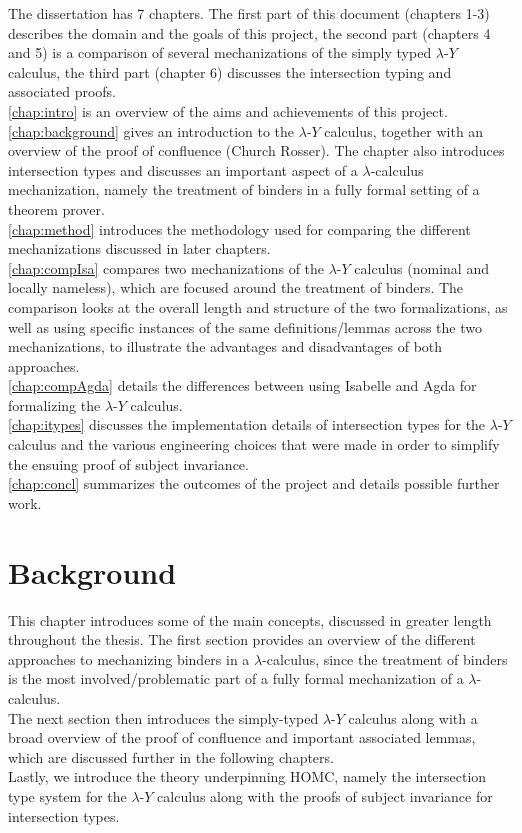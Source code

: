 \documentclass[a4paper, 12pt, twoside]{style/ociamthesis}
\theoremstyle{plain}
\theoremstyle{definition}
\theoremstyle{remark}
\newcommand{\lamy}{\lambda\text{-}Y}
\begin{document}
The dissertation has 7 chapters. The first part of this document
(chapters 1-3) describes the domain and the goals of this project, the
second part (chapters 4 and 5) is a comparison of several mechanizations
of the simply typed \(\lamy\) calculus, the third part (chapter 6)
discusses the intersection typing and associated proofs.\\
\cref{chap:intro} is an overview of the aims and achievements of this
project.\\
\cref{chap:background} gives an introduction to the \(\lamy\) calculus,
together with an overview of the proof of confluence (Church Rosser).
The chapter also introduces intersection types and discusses an
important aspect of a \(\lambda\)-calculus mechanization, namely the
treatment of binders in a fully formal setting of a theorem prover.\\
\cref{chap:method} introduces the methodology used for comparing the
different mechanizations discussed in later chapters.\\
\cref{chap:compIsa} compares two mechanizations of the \(\lamy\)
calculus (nominal and locally nameless), which are focused around the
treatment of binders. The comparison looks at the overall length and
structure of the two formalizations, as well as using specific instances
of the same definitions/lemmas across the two mechanizations, to
illustrate the advantages and disadvantages of both approaches.\\
\cref{chap:compAgda} details the differences between using Isabelle and
Agda for formalizing the \(\lamy\) calculus.\\
\cref{chap:itypes} discusses the implementation details of intersection
types for the \(\lamy\) calculus and the various engineering choices
that were made in order to simplify the ensuing proof of subject
invariance.\\
\cref{chap:concl} summarizes the outcomes of the project and details
possible further work.

\chapter{Background}\label{background}

\label{chap:background}

This chapter introduces some of the main concepts, discussed in greater
length throughout the thesis. The first section provides an overview of
the different approaches to mechanizing binders in a
\(\lambda\)-calculus, since the treatment of binders is the most
involved/problematic part of a fully formal mechanization of a
\(\lambda\)-calculus.\\
The next section then introduces the simply-typed \(\lamy\) calculus
along with a broad overview of the proof of confluence and important
associated lemmas, which are discussed further in the following
chapters.\\
Lastly, we introduce the theory underpinning HOMC, namely the
intersection type system for the \(\lamy\) calculus along with the
proofs of subject invariance for intersection types.
\end{document}
